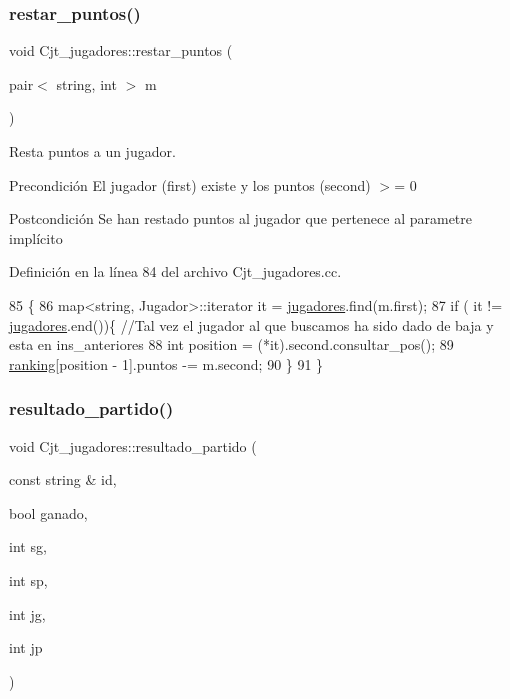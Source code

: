 \subsubsection{\texorpdfstring{restar\+\_\+puntos()}{restar\_puntos()}}
{\footnotesize\ttfamily void Cjt\+\_\+jugadores\+::restar\+\_\+puntos (\begin{DoxyParamCaption}\item[{pair$<$ string, int $>$}]{m }\end{DoxyParamCaption})}



Resta puntos a un jugador. 

\begin{DoxyPrecond}{Precondición}
El jugador (first) existe y los puntos (second) $>$= 0 
\end{DoxyPrecond}
\begin{DoxyPostcond}{Postcondición}
Se han restado puntos al jugador que pertenece al parametre implícito 
\end{DoxyPostcond}


Definición en la línea 84 del archivo Cjt\+\_\+jugadores.\+cc.


\begin{DoxyCode}
85 \{
86   map<string, Jugador>::iterator it = \hyperlink{class_cjt__jugadores_ae3fc5f98e0f343b039bd7dff0e616ecc}{jugadores}.find(m.first);
87   \textcolor{keywordflow}{if} ( it != \hyperlink{class_cjt__jugadores_ae3fc5f98e0f343b039bd7dff0e616ecc}{jugadores}.end())\{ \textcolor{comment}{//Tal vez el jugador al que buscamos ha sido dado de baja y esta en
       ins\_anteriores}
88     \textcolor{keywordtype}{int} position = (*it).second.consultar\_pos();
89     \hyperlink{class_cjt__jugadores_a2a64dd6a0c9315af038dfdb4c27da059}{ranking}[position - 1].puntos -= m.second;
90   \}
91 \}
\end{DoxyCode}
\mbox{\label{class_cjt__jugadores_a843a0aa4f91b785797a5023c23766bf9}} 
\subsubsection{\texorpdfstring{resultado\+\_\+partido()}{resultado\_partido()}}
{\footnotesize\ttfamily void Cjt\+\_\+jugadores\+::resultado\+\_\+partido (\begin{DoxyParamCaption}\item[{const string \&}]{id,  }\item[{bool}]{ganado,  }\item[{int}]{sg,  }\item[{int}]{sp,  }\item[{int}]{jg,  }\item[{int}]{jp }\end{DoxyParamCaption})}



